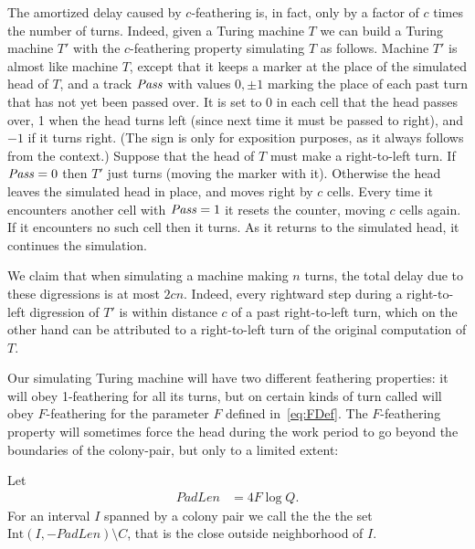 \documentclass[11pt]{memoir}
\theoremstyle{definition} %
\newcommand{\fld}[1]{\ensuremath{\textit{#1\/}}}
\newcommand{\F}{F}
\newcommand{\Int}{\mathrm{Int}} %
\newcommand{\Q}{Q} %
\newcommand{\PadLen}{\mathit{PadLen}} %
\newcommand{\Pass}{\fld{Pass}} %
\begin{document}
\begin{remark}\label{rem:amortized-delay}
  The amortized delay caused by \( c \)-feathering is, in fact, only by a factor of \( c \) times the
  number of turns.
  Indeed, given a Turing machine \( T \) we can build a Turing machine \( T' \)
  with the \( c \)-feathering property simulating \( T \) as follows.
  Machine \( T' \) is almost like machine \( T \), except that it keeps a marker at the place
  of the simulated head of \( T \), and a track \( \Pass \) with values \( 0,\pm 1 \)
  marking the place of each past turn that has not yet been passed over.
  It is set to 0 in each cell that the head passes over, 1 when the head turns left (since next time
  it must be passed to right), and \( -1 \) if it turns right.
  (The sign is only for exposition purposes, as it always follows from the context.)
  Suppose that the head of \( T \) must make a right-to-left turn.
  If \( \Pass=0 \) then \( T' \) just turns (moving the marker with it).
  Otherwise the head leaves the simulated head in place, and moves right by \( c \) cells.
  Every time it encounters another cell with \( \Pass=1 \) it resets the counter,
  moving \( c \) cells again.
  If it encounters no such cell then it turns.
  As it returns to the simulated head, it continues the simulation.

  We claim that when simulating a machine making \( n \) turns,
  the total delay due to these digressions is at most \( 2 c n \).
  Indeed, every rightward step during a right-to-left digression of \( T' \)
  is within distance \( c \) of a past right-to-left turn, which on the other hand
  can be attributed to a right-to-left turn of the original computation of \( T \).
\end{remark}

Our simulating Turing machine will have two different feathering properties: it will 
obey 1-feathering for all its turns, but on certain kinds of turn called 
will obey \( \F \)-feathering for the parameter \( \F \) defined in~\eqref{eq:FDef}.
The \( \F \)-feathering property will sometimes force the head during the work period
to go beyond the boundaries of the colony-pair, but only to a limited extent:

\begin{definition}\label{def:PadLen}
Let 
\begin{align}\label{eq:PadLen}
  \PadLen &= 4\F\log\Q.   %
\end{align}
For an interval \( I \) spanned by a colony pair we call the 
the  the set \( \Int(I,-\PadLen)\setminus C \), that is the close
outside neighborhood of \( I \).
\end{definition}
\end{document}

